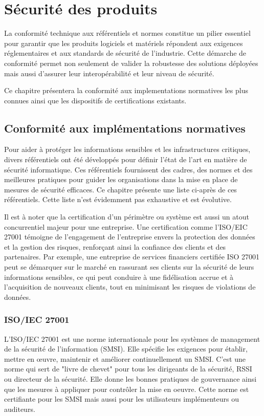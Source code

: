 \section{Sécurité des produits}


La conformité technique aux référentiels et normes constitue un pilier essentiel pour garantir que les produits logiciels et matériels répondent aux exigences réglementaires et aux standards de sécurité de l'industrie. Cette démarche de conformité permet non seulement de valider la robustesse des solutions déployées mais aussi d'assurer leur interopérabilité et leur niveau de sécurité.

Ce chapitre présentera la conformité aux implementations normatives les plus connues ainsi que les dispositifs de certifications existants.

\subsection{Conformité aux implémentations normatives}
Pour aider à protéger les informations sensibles et les infrastructures critiques, divers référentiels ont été développés pour définir l'état de l'art en matière de sécurité informatique. Ces référentiels fournissent des cadres, des normes et des meilleures pratiques pour guider les organisations dans la mise en place de mesures de sécurité efficaces. Ce chapitre présente une liste ci-après de ces référentiels. Cette liste n'est évidemment pas exhaustive et est évolutive.

Il est à noter que la certification d'un périmètre ou système est aussi un atout concurrentiel majeur pour une entreprise. Une certification comme l'ISO/EIC 27001 témoigne de l'engagement de l'entreprise envers la protection des données et la gestion des risques, renforçant ainsi la confiance des clients et des partenaires. Par exemple, une entreprise de services financiers certifiée ISO 27001 peut se démarquer sur le marché en rassurant ses clients sur la sécurité de leurs informations sensibles, ce qui peut conduire à une fidélisation accrue et à l'acquisition de nouveaux clients, tout en minimisant les risques de violations de données.

\subsubsection{ISO/IEC 27001}
L'ISO/IEC 27001 est une norme internationale pour les systèmes de management de la sécurité de l'information (SMSI). Elle spécifie les exigences pour établir, mettre en œuvre, maintenir et améliorer continuellement un SMSI. C'est une norme qui sert de "livre de chevet" pour tous les dirigeants de la sécurité, RSSI ou directeur de la sécurité. Elle donne les bonnes pratiques de gouvernance ainsi que les mesures à appliquer pour contrôler la mise en oeuvre. Cette norme est certifiante pour les SMSI mais aussi pour les utilisateurs implémenteurs ou auditeurs.
	
